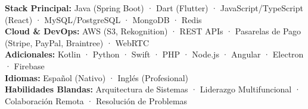 
\begin{cvparagraph}
\textbf{Stack Principal:} Java (Spring Boot) · Dart (Flutter) · JavaScript/TypeScript (React) · MySQL/PostgreSQL · MongoDB · Redis
\\
\textbf{Cloud \& DevOps:} AWS (S3, Rekognition) · REST APIs · Pasarelas de Pago (Stripe, PayPal, Braintree) · WebRTC
\\
\textbf{Adicionales:} Kotlin · Python · Swift · PHP · Node.js · Angular · Electron · Firebase
\\
\textbf{Idiomas:} Español (Nativo) · Inglés (Profesional)
\\
\textbf{Habilidades Blandas:} Arquitectura de Sistemas · Liderazgo Multifuncional · Colaboración Remota · Resolución de Problemas
\end{cvparagraph}
